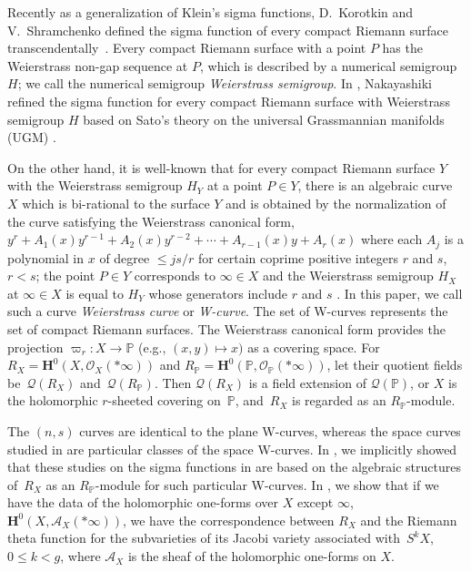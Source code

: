 \documentclass[10pt,a4paper]{amsart}
\def\PP{{\mathbb P}}
\def\bH{{\mathbf F}}
\def\bH{{\mathbf H}}
\def\cA{{\mathcal A}}
\def\cO{{\mathcal O}}
\def\cQ{{\mathcal Q}}
\numberwithin{equation}{section}
\begin{document}
Recently as a generalization of Klein's sigma functions, D.~Korotkin and V.~Shramchenko defined the sigma function of every compact Riemann surface transcendentally~\cite{KorotkinS}.
Every compact Riemann surface with a point $P$ has the Weierstrass non-gap sequence at $P$, which is described by a numerical semigroup $H$; we call the numerical semigroup \emph{Weierstrass semigroup}.
In \cite{Nak16}, Nakayashiki refined the sigma function for every compact Riemann surface with Weierstrass semigroup $H$ based on Sato's theory on the universal Grassmannian manifolds (UGM) \cite{SatoN84,SegalWilson}.

On the other hand,
it is well-known that for every compact Riemann surface $Y$ with the Weierstrass semigroup $H_Y$ at a point $P\in Y$,
there is an algebraic curve $X$ which is bi-rational to the surface $Y$ and is obtained by the normalization of the curve satisfying the Weierstrass canonical form, $y^r + A_{1}(x) y^{r-1} + A_{2}(x) y^{r-2} +\cdots + A_{r-1}(x) y + A_{r}(x)$ where each $A_j$ is a polynomial in $x$ of degree $\leq j s/r$ for certain coprime positive integers $r$ and $s$, $r<s$; the point $P\in Y$ corresponds to $\infty \in X$ and the Weierstrass semigroup $H_X$ at $\infty \in X$ is equal to $H_Y$ whose generators include $r$ and $s$
\cite{Baker97, CoppensKato, Kato80, Wei67}.
In this paper, we call such a curve \emph{Weierstrass curve} or \emph{W-curve}. The set of W-curves represents the set of compact Riemann surfaces.
The Weierstrass canonical form
 provides the projection $\varpi_r\colon X \to \PP$ (e.g., $(x,y) \mapsto x)$ as a covering space.
For $R_X = \bH^0(X, \cO_X(*\infty))$ and $R_\PP = \bH^0(\PP, \cO_\PP(*\infty))$, let their quotient fields be~$\cQ(R_X)$ and~$\cQ(R_\PP)$.
Then $\cQ(R_X)$ is a field extension of $\cQ(\PP)$, or $X$ is the holomorphic $r$-sheeted covering on~$\PP$, and~$R_X$ is regarded as an $R_\PP$-module.

The $(n,s)$ curves are identical to the plane W-curves, whereas the space curves studied in \cite{ KMP13, KMP19, MK13} are particular classes of the space W-curves.
In \cite{KMP19}, we implicitly showed that these studies on the sigma functions in \cite{BEL20,KMP13, MP08, MP14, Onishi18} are based on the algebraic structures of~$R_X$ as an $R_\PP$-module for such particular W-curves.
In \cite{KM2020}, we show that if we have the data of the holomorphic one-forms over $X$ except $\infty$, $\bH^0(X, \cA_X(*\infty))$,
we have the correspondence between $R_X$ and the Riemann theta function for the subvarieties of its Jacobi variety associated with~$S^k X$, $0\le k <g$, where $\cA_X$ is the sheaf of the holomorphic one-forms on $X$.
\end{document}
